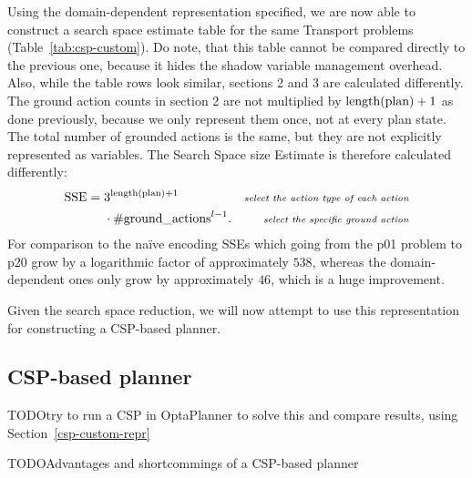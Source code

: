 {Using the domain-dependent representation specified, we are now able to construct
a search space estimate table for the same Transport problems (Table~\ref{tab:csp-custom}).
Do note, that this table cannot be compared directly to the previous one,
because it hides the shadow variable management overhead.
Also, while the table rows look similar, sections 2 and 3 are calculated
differently. The ground action counts in section 2 are not multiplied by $\textrm{length(plan)} + 1$
as done previously, because we only represent them once, not at every plan state.
The total number of grounded actions is the same, but they are not explicitly represented as variables. The Search Space size Estimate is therefore calculated differently:
\begin{align*}
\textrm{SSE} =\; &3^{\textrm{length(plan)} + 1} & \textit{\scriptsize select the action type of each action}\\
&\cdot \textrm{\#ground\_actions}^{l-1}. & \textit{\scriptsize select the specific ground action}
\end{align*}
For comparison to the na{\"{i}}ve encoding SSEs which going from the p01 problem to p20 grow by a logarithmic factor of approximately $538$,
whereas the domain-dependent ones only grow by approximately $46$,
which is a huge improvement.

Given the search space reduction, we will now attempt to use this representation
for constructing a CSP-based planner.

\subsection{CSP-based planner}\label{csp-planner}

TODO{try to run a CSP in OptaPlanner to solve this and compare results, using Section~\ref{csp-custom-repr}}

TODO{Advantages and shortcommings of a CSP-based planner}

}